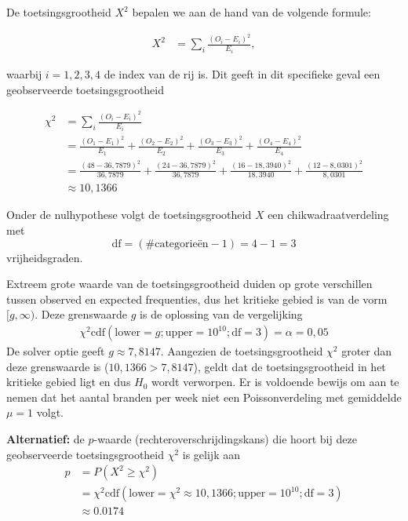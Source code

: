 {    De toetsingsgrootheid $X^2$ bepalen we aan de hand van de volgende formule:

    \begin{align*}
        X^2  &= \sum_{i} \frac{(O_{i} - E_{i})^2}{E_{i}},
    \end{align*}

    waarbij $i = 1,2,3,4$ de index van de rij is.
    Dit geeft in dit specifieke geval een geobserveerde toetsingsgrootheid 
    
    \begin{align*}
        \chi^2  &= \sum_{i} \frac{(O_{i} - E_{i})^2}{E_{i}} \\
                &=\frac{(O_{1} - E_{1})^2}{E_{1}} + \frac{(O_{2} - E_{2})^2}{E_{2}} + \frac{(O_{3} - E_{3})^2}{E_{3}} + \frac{(O_{4} - E_{4})^2}{E_{4}} \\
                &= \frac{(48 - 36,7879)^2}{36,7879} + \frac{(24-36,7879)^2}{36,7879} + \frac{(16-18,3940)^2}{18,3940} + \frac{(12-8,0301)^2}{8,0301} \\
                &\approx 10,1366
    \end{align*}

    Onder de nulhypothese volgt de toetsingsgrootheid $X$ een chikwadraatverdeling met
    \[
        \text{df} = (\#\text{categorie\"en}-1) = 4 - 1 = 3
    \]
    vrijheidsgraden.

    Extreem grote waarde van de toetsingsgrootheid duiden op grote verschillen tussen observed en expected frequenties, dus het kritieke gebied is van de vorm $[g, \infty)$.
    Deze grenswaarde $g$ is de oplossing van de vergelijking
    \begin{align*}
        \chi^2\text{cdf}(\text{lower}=g; \text{upper}=10^{10}; \text{df}=3) = \alpha = 0,05
    \end{align*}
    De solver optie geeft $g \approx 7,8147$.
    Aangezien de toetsingsgrootheid $\chi^2$ groter dan deze grenswaarde is ($10,1366 > 7,8147$), geldt dat de toetsingsgrootheid in het kritieke gebied ligt en dus $H_0$ wordt verworpen.
    Er is voldoende bewijs om aan te nemen dat het aantal branden per week niet een Poissonverdeling met gemiddelde $\mu=1$ volgt.
    
    \begin{center}
    \end{center}

    {\bfseries Alternatief:} de $p$-waarde (rechteroverschrijdingskans) die hoort bij deze geobserveerde toetsingsgrootheid $\chi^2$ is gelijk aan
    \begin{align*}
        p   &= P(X^2 \ge \chi^2) \\
            &= \chi^2\text{cdf}(\text{lower}=\chi^2\approx 10,1366; \text{upper}=10^{10}; \text{df}=3) \\
            &\approx 0.0174
    \end{align*}

}
